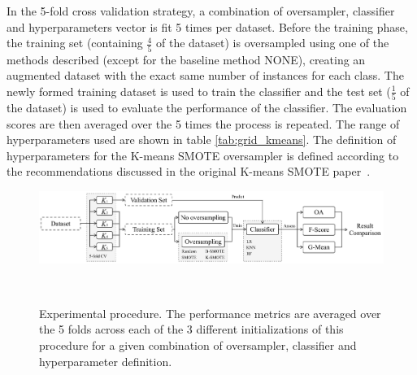 In the 5-fold cross validation strategy, a combination
of oversampler, classifier and hyperparameters vector is fit 5 times
per dataset. Before the training
phase, the training set
(containing $\frac{4}{5}$ of the dataset) is oversampled using one of the methods
described (except for the baseline method NONE), creating an augmented
dataset with the exact same number of instances for
each class. The newly formed training dataset is used to train the classifier
and the test set ($\frac{1}{5}$ of the dataset)
is used to evaluate the performance of the classifier. The evaluation scores
are then averaged over the 5 times the process is repeated. The range of
hyperparameters used are shown in table \ref{tab:grid_kmeans}. The definition of
hyperparameters for the K-means SMOTE oversampler is defined according to the
recommendations discussed in the original K-means SMOTE
paper~\cite{Douzas2018}.

\begin{figure}
	\centering
	\includegraphics[width=1\linewidth]{experiment_pipeline}
    \caption[Experimental procedure.]{Experimental procedure. The performance metrics are averaged over
        the 5 folds across each of the 3 different initializations of this
        procedure for a given combination of oversampler, classifier and
        hyperparameter definition.
    }~\label{fig:experiment_pipeline}
\end{figure}

